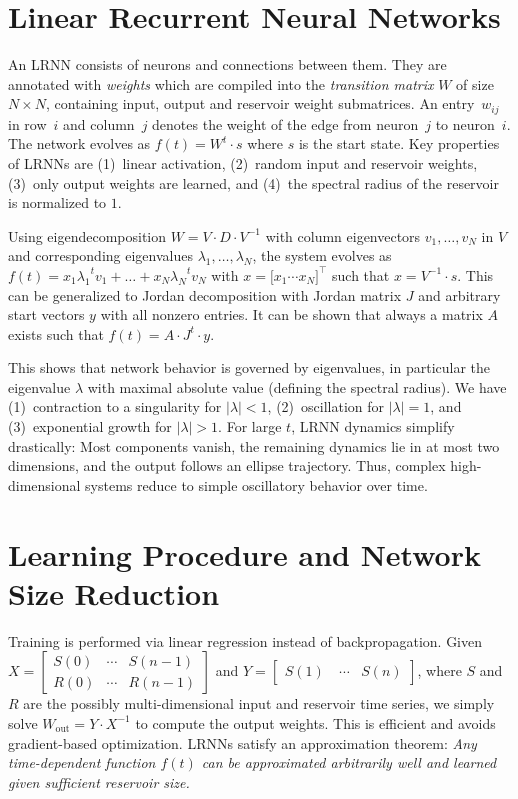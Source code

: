 \documentclass[11pt]{llncs}
\begin{document}
\section{Linear Recurrent Neural Networks}

An LRNN consists of neurons and connections between them. They are annotated
with \emph{weights} which are compiled into the \emph{transition matrix} $W$ of
size $N \times N$, containing input, output and reservoir weight submatrices.
An entry~$w_{ij}$ in row~$i$ and column~$j$ denotes the weight of the edge from
neuron~$j$ to neuron~$i$. The network evolves as $f(t) = W^t \cdot s$ where $s$ is the
start state. Key properties of LRNNs are (1)~linear activation, (2)~random input
and reservoir weights, (3)~only output weights are learned, and (4)~the spectral
radius of the reservoir is normalized to $1$.

Using eigendecomposition $W = V \cdot D \cdot V^{-1}$ with column eigenvectors
$v_1,\dots,v_N$ in $V$ and corresponding eigenvalues $\lambda_1, \dots,
\lambda_N$, the system evolves as $f(t) = x_1 {\lambda_1}^t v_1 +\dots+ x_N
{\lambda_N}^t v_N$ with $x = \big[ x_1 \cdots x_N \big]^\top$\! such that $x =
V^{-1} \cdot s$. This can be generalized to Jordan decomposition with Jordan
matrix $J$ and arbitrary start vectors $y$ with all nonzero entries. It can be
shown that always a matrix $A$ exists such that $f(t) = A \cdot J^t \cdot y$.

This shows that network behavior is governed by eigenvalues, in particular the
eigenvalue $\lambda$ with maximal absolute value (defining the spectral radius).
We have (1)~contraction to a singularity for $|\lambda| < 1$, (2)~oscillation
for $|\lambda| = 1$, and (3)~exponential growth for $|\lambda| > 1$. For large
$t$, LRNN dynamics simplify drastically: Most components vanish, the remaining
dynamics lie in at most two dimensions, and the output follows an ellipse
trajectory. Thus, complex high-dimensional systems reduce to simple oscillatory
behavior over time.

\section{Learning Procedure and Network Size Reduction}

Training is performed via linear regression instead of backpropagation. Given
$X =
\begin{bmatrix}
S(0) & \cdots & S(n-1)\\
R(0) & \cdots & R(n-1)
\end{bmatrix}$
and
$Y =
\begin{bmatrix}
S(1)~& \cdots & S(n)
\end{bmatrix}$,
where $S$ and $R$ are the possibly multi-dimensional input and reservoir time
series, we simply solve $W_{\text{out}} = Y \cdot X^{-1}$ to compute the output
weights. This is efficient and avoids gradient-based optimization. LRNNs
satisfy an approximation theorem: \emph{Any time-dependent function $f(t)$ can
be approximated arbitrarily well and learned given sufficient reservoir size.}
\end{document}
